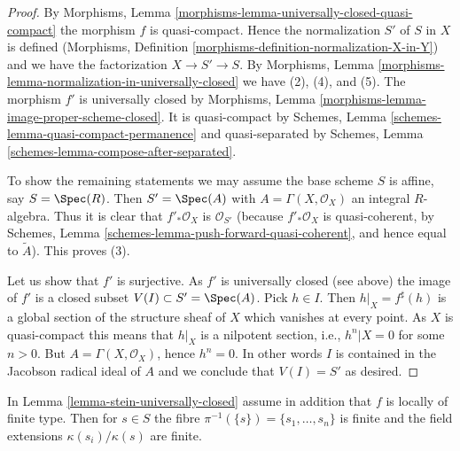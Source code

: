 \begin{proof}
By Morphisms, Lemma \ref{morphisms-lemma-universally-closed-quasi-compact}
the morphism $f$ is quasi-compact. Hence the normalization $S'$ of $S$ in
$X$ is defined (Morphisms, Definition
\ref{morphisms-definition-normalization-X-in-Y})
and we have the factorization $X \to S' \to S$. By
Morphisms, Lemma \ref{morphisms-lemma-normalization-in-universally-closed}
we have (2), (4), and (5). The morphism $f'$ is universally closed by
Morphisms, Lemma \ref{morphisms-lemma-image-proper-scheme-closed}.
It is quasi-compact by
Schemes, Lemma \ref{schemes-lemma-quasi-compact-permanence}
and quasi-separated by
Schemes, Lemma \ref{schemes-lemma-compose-after-separated}.

\medskip\noindent
To show the remaining statements we may assume the base scheme $S$ is affine,
say $S = \Spec(R)$. Then $S' = \Spec(A)$ with
$A = \Gamma(X, \mathcal{O}_X)$ an integral $R$-algebra.
Thus it is clear that $f'_*\mathcal{O}_X$
is $\mathcal{O}_{S'}$ (because $f'_*\mathcal{O}_X$ is quasi-coherent,
by
Schemes, Lemma
\ref{schemes-lemma-push-forward-quasi-coherent},
and hence equal to $\widetilde{A}$). This proves (3).

\medskip\noindent
Let us show that $f'$ is surjective. As $f'$ is universally closed (see above)
the image of $f'$ is a closed subset
$V(I) \subset S' = \Spec(A)$. Pick $h \in I$. Then
$h|_X = f^\sharp(h)$ is a global section of the structure sheaf of
$X$ which vanishes at every point. As $X$ is quasi-compact this means
that $h|_X$ is a nilpotent section, i.e., $h^n|X = 0$ for some $n > 0$.
But $A = \Gamma(X, \mathcal{O}_X)$, hence $h^n = 0$.
In other words $I$ is contained in the Jacobson radical ideal of $A$
and we conclude that $V(I) = S'$ as desired.
\end{proof}

\begin{lemma}
\label{lemma-stein-universally-closed-residue-fields}
In Lemma \ref{lemma-stein-universally-closed} assume in addition that
$f$ is locally of finite type. Then for $s \in S$ the fibre
$\pi^{-1}(\{s\}) = \{s_1, \ldots, s_n\}$ is finite and the field extensions
$\kappa(s_i)/\kappa(s)$ are finite.
\end{lemma}

